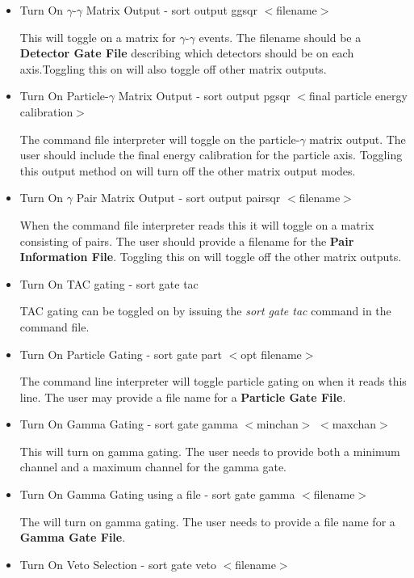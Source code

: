 \begin{itemize}
\begin{itemize}
\item{Turn On $\gamma$-$\gamma$ Matrix Output - sort output ggsqr $<$filename$>$}

This will toggle on a matrix for $\gamma$-$\gamma$ events.  The filename should be a {\bf Detector Gate File} describing which detectors should be on each axis.Toggling this on will also toggle off other matrix outputs.

\item{Turn On Particle-$\gamma$ Matrix Output - sort output pgsqr $<$final particle energy calibration$>$}

The command file interpreter will toggle on the particle-$\gamma$ matrix output.  The user should include the final energy calibration for the particle axis.  Toggling this output method on will turn off the other matrix output modes.

\item{Turn On $\gamma$ Pair Matrix Output - sort output pairsqr $<$filename$>$}

When the command file interpreter reads this it will toggle on a matrix consisting of pairs. The user should provide a filename for the {\bf Pair Information File}.  Toggling this on will toggle off the other matrix outputs.

\item{Turn On TAC gating - sort gate tac}

TAC gating can be toggled on by issuing the {\it sort gate tac} command in the command file.

\item{Turn On Particle Gating - sort gate part $<$opt filename$>$}

The command line interpreter will toggle particle gating on when it reads this line.  The user may provide a file name for a {\bf Particle Gate File}.

\item{Turn On Gamma Gating - sort gate gamma $<$minchan$>$ $<$maxchan$>$}

This will turn on gamma gating.  The user needs to provide both a minimum channel and a maximum channel for the gamma gate.

\item{Turn On Gamma Gating using a file - sort gate gamma $<$filename$>$}

The will turn on gamma gating.  The user needs to provide a file name for a {\bf Gamma Gate File}.

\item{Turn On Veto Selection - sort gate veto $<$filename$>$}


\end{itemize}
\end{itemize}
